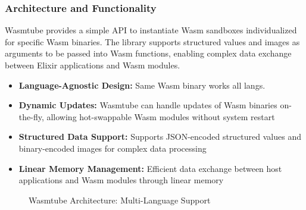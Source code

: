 \documentclass[11pt]{article}
\begin{document}
\subsubsection{Architecture and Functionality}

Wasmtube \cite{wasmtube2023} provides a simple API to instantiate Wasm sandboxes individualized for specific Wasm binaries. The library supports structured values and images as arguments to be passed into Wasm functions, enabling complex data exchange between Elixir applications and Wasm modules.

\begin{itemize}
\item \textbf{Language-Agnostic Design:} Same Wasm binary works all langs.
\item \textbf{Dynamic Updates:} Wasmtube can handle updates of Wasm binaries on-the-fly, allowing hot-swappable Wasm modules without system restart
\item \textbf{Structured Data Support:} Supports JSON-encoded structured values and binary-encoded images for complex data processing
\item \textbf{Linear Memory Management:} Efficient data exchange between host applications and Wasm modules through linear memory
\end{itemize}

\begin{figure}[h]
\footnotesize
\centering
{}
\caption{Wasmtube Architecture: Multi-Language Support}
\end{figure}
\end{document}
